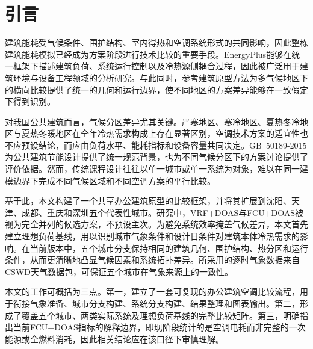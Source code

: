 \section{引言}

建筑能耗受气候条件、围护结构、室内得热和空调系统形式的共同影响，因此整栋建筑能耗模拟已经成为方案阶段进行技术比较的重要手段。EnergyPlus能够在统一框架下描述建筑负荷、系统运行控制以及冷热源侧耦合过程，因此被广泛用于建筑环境与设备工程领域的分析研究\cite{crawley2001energyplus,energyplus232docs}。与此同时，参考建筑原型方法为多气候地区下的横向比较提供了统一的几何和运行边界，使不同地区的方案差异能够在一致假定下得到识别\cite{deru2011reference,field2010reference}。

对我国公共建筑而言，气候分区差异尤其关键。严寒地区、寒冷地区、夏热冬冷地区与夏热冬暖地区在全年冷热需求构成上存在显著区别，空调技术方案的适宜性也不应预设结论，而应由负荷水平、能耗指标和设备容量共同决定。GB~50189-2015为公共建筑节能设计提供了统一规范背景，也为不同气候分区下的方案讨论提供了评价依据\cite{gb50189}。然而，传统课程设计往往以单一城市或单一系统为对象，难以在同一建模边界下完成不同气候区域和不同空调方案的平行比较。

基于此，本文构建了一个共享办公建筑原型的比较框架，并将其扩展到沈阳、天津、成都、重庆和深圳五个代表性城市。研究中，VRF+DOAS与FCU+DOAS被视为完全并列的候选方案，不预设主次。为避免系统效率掩盖气候差异，本文首先建立理想负荷基线，用以识别城市气象条件和设计日条件对建筑本体冷热需求的影响。在当前版本中，五个城市分支保持相同的建筑几何、围护结构、热分区和运行条件，从而更清晰地凸显气候因素和系统拓扑差异。所采用的逐时气象数据来自CSWD天气数据包，可保证五个城市在气象来源上的一致性\cite{onebuilding}。

本文的工作可概括为三点。第一，建立了一套可复现的办公建筑空调比较流程，用于衔接气象准备、城市分支构建、系统分支构建、结果整理和图表输出。第二，形成了覆盖五个城市、两类实际系统及理想负荷基线的完整比较矩阵。第三，明确指出当前FCU+DOAS指标的解释边界，即现阶段统计的是空调电耗而非完整的一次能源或全燃料消耗，因此相关结论应在该口径下审慎理解。
